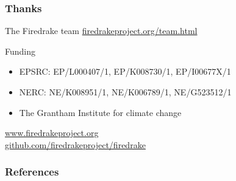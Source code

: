 \documentclass[presentation]{beamer}
\begin{document}
\begin{frame}
  \frametitle{Thanks}
  \begin{block}{The Firedrake team}
    \href{http://firedrakeproject.org/team.html}{firedrakeproject.org/team.html}
  \end{block}
  \begin{block}{Funding}
    \begin{itemize}
    \item EPSRC: EP/L000407/1, EP/K008730/1, EP/I00677X/1
    \item NERC: NE/K008951/1, NE/K006789/1, NE/G523512/1
    \item The Grantham Institute for climate change
    \end{itemize}
  \end{block}
  \begin{center}
    \href{http://www.firedrakeproject.org}{www.firedrakeproject.org}\\
    \href{http://github.com/firedrakeproject/firedrake}{github.com/firedrakeproject/firedrake}
  \end{center}
\end{frame}

\begin{frame}
  \frametitle{References}
  \renewcommand*{\bibfont}{\footnotesize}
  \printbibliography
\end{frame}
\end{document}
